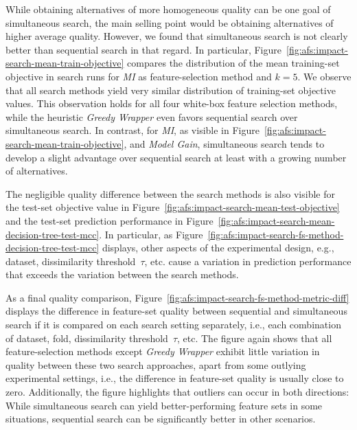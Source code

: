 \documentclass{article}
\theoremstyle{definition}
\begin{document}
While obtaining alternatives of more homogeneous quality can be one goal of simultaneous search, the main selling point would be obtaining alternatives of higher average quality.
However, we found that simultaneous search is not clearly better than sequential search in that regard.
In particular, Figure~\ref{fig:afs:impact-search-mean-train-objective} compares the distribution of the mean training-set objective in search runs for \emph{MI} as feature-selection method and $k=5$.
We observe that all search methods yield very similar distribution of training-set objective values.
This observation holds for all four white-box feature selection methods, while the heuristic \emph{Greedy Wrapper} even favors sequential search over simultaneous search.
In contrast, for \emph{MI}, as visible in Figure~\ref{fig:afs:impact-search-mean-train-objective}, and \emph{Model Gain}, simultaneous search tends to develop a slight advantage over sequential search at least with a growing number of alternatives.

The negligible quality difference between the search methods is also visible for the test-set objective value in Figure~\ref{fig:afs:impact-search-mean-test-objective} and the test-set prediction performance in Figure~\ref{fig:afs:impact-search-mean-decision-tree-test-mcc}.
In particular, as Figure~\ref{fig:afs:impact-search-fs-method-decision-tree-test-mcc} displays, other aspects of the experimental design, e.g., dataset, dissimilarity threshold~$\tau$, etc. cause a variation in prediction performance that exceeds the variation between the search methods.

As a final quality comparison, Figure~\ref{fig:afs:impact-search-fs-method-metric-diff} displays the difference in feature-set quality between sequential and simultaneous search if it is compared on each search setting separately, i.e., each combination of dataset, fold, dissimilarity threshold~$\tau$, etc.
The figure again shows that all feature-selection methods except \emph{Greedy Wrapper} exhibit little variation in quality between these two search approaches, apart from some outlying experimental settings, i.e., the difference in feature-set quality is usually close to zero.
Additionally, the figure highlights that outliers can occur in both directions:
While simultaneous search can yield better-performing feature sets in some situations, sequential search can be significantly better in other scenarios.
\end{document}
